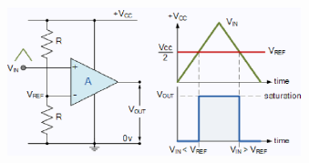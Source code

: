 \begin{frame}
\begin{columns}
\begin{figure}
\end{figure}
\begin{figure}
	\centering
	\includegraphics[scale=0.22]{Images/App_fig3.eps}
\end{figure}
\end{columns}

\begin{scriptsize}
\cite{risi2014massive,plan2013robust,baraniuk2017exponential}
\end{scriptsize}
\end{frame}
